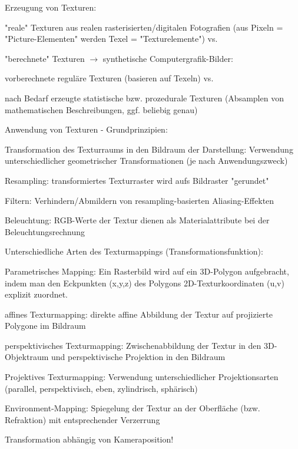 \documentclass[landscape]{article}
\begin{document}
\begin{multicols}{3}
  Erzeugung von Texturen:
  \begin{itemize*}
    \item "reale" Texturen aus realen rasterisierten/digitalen Fotografien (aus Pixeln = "Picture-Elementen" werden Texel = "Texturelemente") vs.
    \item "berechnete" Texturen $\rightarrow$ synthetische Computergrafik-Bilder:
    \item vorberechnete reguläre Texturen (basieren auf Texeln) vs.
    \item nach Bedarf erzeugte statistische bzw. prozedurale Texturen (Absamplen von mathematischen Beschreibungen, ggf. beliebig genau)
  \end{itemize*}
  
  Anwendung von Texturen - Grundprinzipien:
  \begin{itemize*}
    \item Transformation des Texturraums in den Bildraum der Darstellung: Verwendung unterschiedlicher geometrischer Transformationen (je nach Anwendungszweck)
    \item Resampling: transformiertes Texturraster wird aufs Bildraster "gerundet"
    \item Filtern: Verhindern/Abmildern von resampling-basierten Aliasing-Effekten
    \item Beleuchtung: RGB-Werte der Textur dienen als Materialattribute bei der Beleuchtungsrechnung
  \end{itemize*}
  
  Unterschiedliche Arten des Texturmappings (Transformationsfunktion):
  \begin{itemize*}
    \item Parametrisches Mapping: Ein Rasterbild wird auf ein 3D-Polygon aufgebracht, indem man den Eckpunkten (x,y,z) des Polygons 2D-Texturkoordinaten (u,v) explizit zuordnet.
    \item affines Texturmapping: direkte affine Abbildung der Textur auf projizierte Polygone im Bildraum
    \item perspektivisches Texturmapping: Zwischenabbildung der Textur in den 3D-Objektraum und perspektivische Projektion in den Bildraum
    \item Projektives Texturmapping: Verwendung unterschiedlicher Projektionsarten (parallel, perspektivisch, eben, zylindrisch, sphärisch)
    \item Environment-Mapping: Spiegelung der Textur an der Oberfläche (bzw. Refraktion) mit entsprechender Verzerrung
    \item Transformation abhängig von Kameraposition!
  \end{itemize*}
  

\end{multicols}
\end{document}
